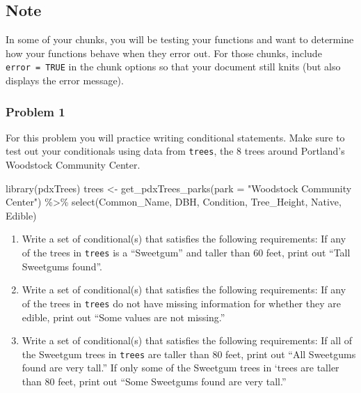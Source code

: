 \documentclass[
]{article}
\newenvironment{Shaded}{\begin{snugshade}}{\end{snugshade}}
\newcommand{\AttributeTok}[1]{\textcolor[rgb]{0.77,0.63,0.00}{#1}}
\newcommand{\FunctionTok}[1]{\textcolor[rgb]{0.00,0.00,0.00}{#1}}
\newcommand{\NormalTok}[1]{#1}
\newcommand{\OtherTok}[1]{\textcolor[rgb]{0.56,0.35,0.01}{#1}}
\newcommand{\SpecialCharTok}[1]{\textcolor[rgb]{0.00,0.00,0.00}{#1}}
\newcommand{\StringTok}[1]{\textcolor[rgb]{0.31,0.60,0.02}{#1}}
\begin{document}
\hypertarget{note}{%
\subsection{Note}\label{note}}

In some of your chunks, you will be testing your functions and want to
determine how your functions behave when they error out. For those
chunks, include \texttt{error\ =\ TRUE} in the chunk options so that
your document still knits (but also displays the error message).

\hypertarget{problem-1}{%
\subsubsection{Problem 1}\label{problem-1}}

For this problem you will practice writing conditional statements. Make
sure to test out your conditionals using data from \texttt{trees}, the 8
trees around Portland's Woodstock Community Center.

\begin{Shaded}
\begin{Highlighting}[]
\FunctionTok{library}\NormalTok{(pdxTrees)}
\NormalTok{trees }\OtherTok{\textless{}{-}} \FunctionTok{get\_pdxTrees\_parks}\NormalTok{(}\AttributeTok{park =} \StringTok{"Woodstock Community Center"}\NormalTok{) }\SpecialCharTok{\%\textgreater{}\%}
  \FunctionTok{select}\NormalTok{(Common\_Name, DBH, Condition, Tree\_Height,}
\NormalTok{         Native, Edible)}
\end{Highlighting}
\end{Shaded}

\begin{enumerate}
\def\labelenumi{\alph{enumi}.}
\item
  Write a set of conditional(s) that satisfies the following
  requirements: If any of the trees in \texttt{trees} is a ``Sweetgum''
  and taller than 60 feet, print out ``Tall Sweetgums found''.
\item
  Write a set of conditional(s) that satisfies the following
  requirements: If any of the trees in \texttt{trees} do not have
  missing information for whether they are edible, print out ``Some
  values are not missing.''
\item
  Write a set of conditional(s) that satisfies the following
  requirements: If all of the Sweetgum trees in \texttt{trees} are
  taller than 80 feet, print out ``All Sweetgums found are very tall.''
  If only some of the Sweetgum trees in `trees are taller than 80 feet,
  print out ``Some Sweetgums found are very tall.''
\end{enumerate}
\end{document}
